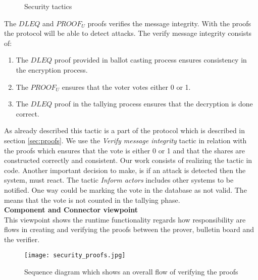 \begin{figure}[H]
\centering
  \caption{Security tactics \cite{Bass}}   
\end{figure}

\noindent
The $DLEQ$ and $PROOF_U$ proofs verifies the message integrity. With the proofs the protocol will be able to detect attacks. The verify message integrity consists of:

\begin{enumerate}
    \item The $DLEQ$ proof provided in ballot casting process ensures consistency in the encryption process.
    \item  The $PROOF_U$ ensures that the voter votes either 0 or 1.
    \item  The $DLEQ$ proof in the tallying process ensures that the decryption is done correct.
\end{enumerate}

\noindent
As already described this tactic is a part of the protocol which is described in section \ref{sec:proofs}. We use the \textit{Verify message integrity} tactic in relation with the proofs which ensures that the vote is either 0 or 1 and that the shares are constructed correctly and consistent. Our work consists of realizing the tactic in code. Another important decision to make, is if an attack is detected then the system, must react. The tactic \textit{Inform actors} includes other systems to be notified. One way could be marking the vote in the database as not valid. The means that the vote is not counted in the tallying phase.\\   

\noindent
\textbf{Component and Connector viewpoint}\\
This viewpoint shows the runtime functionality regards how responsibility are flows in creating and verifying the proofs between the prover, bulletin board and the verifier. 

\begin{figure}[H]
\centering
     \texttt{[image: security\_proofs.jpg]}
     \caption{Sequence diagram which shows an overall flow of verifying the proofs}     
\end{figure}



